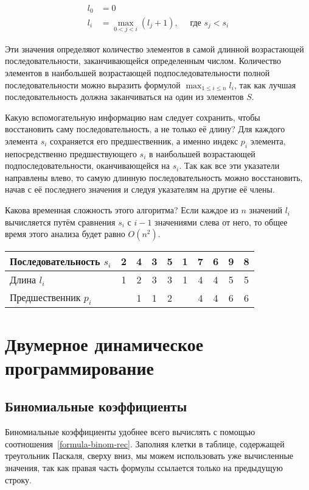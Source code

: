 \documentclass[14pt,openany]{book}
\begin{document}
\begin{align*}
l_0 &= 0 \\
l_i &= \max_{0<j<i}(l_j + 1), \quad \text{ где $s_j < s_i$}
\end{align*}

Эти значения определяют количество элементов в самой длинной возрастающей последовательности,
заканчивающейся определенным числом. Количество элементов в наибольшей возрастающей
подпоследовательности полной последовательности можно выразить формулой $\max_{1\le i\le n}l_i$,
так как лучшая последовательность должна заканчиваться на один из элементов $S$.

Какую вспомогательную информацию нам следует сохранить, чтобы восстановить саму
последовательность, а не только её длину? Для каждого элемента $s_i$ сохраняется его
предшественник, а именно индекс $p_i$ элемента, непосредственно предшествующего $s_i$
в наибольшей возрастающей подпоследовательности, оканчивающейся на $s_i$. Так как все
эти указатели направлены влево, то самую длинную последовательность можно восстановить,
начав с её последнего значения и следуя указателям на другие её члены.

Какова временная сложность этого алгоритма? Если каждое из $n$ значений $l_i$ вычисляется
путём сравнения $s_i$ с $i-1$ значениями слева от него, то общее время этого анализа
будет равно $O(n^2)$.

\begin{tabular}{l|c|c|c|c|c|c|c|c|c}
Последовательность $s_i$ & 2 & 4 & 3 & 5 & 1 & 7 & 6 & 9 & 8 \\
\hline
Длина $l_i$              & 1 & 2 & 3 & 3 & 1 & 4 & 4 & 5 & 5 \\
\hline
Предшественник $p_i$     &   & 1 & 1 & 2 &   & 4 & 4 & 6 & 6 \\
\end{tabular}



\chapter{Двумерное динамическое программирование}

\section{Биномиальные коэффициенты}

Биномиальные коэффициенты удобнее всего вычислять с помощью соотношения~\ref{formula-binom-rec}.
Заполняя клетки в таблице, содержащей треугольник Паскаля, сверху вниз, мы можем
использовать уже вычисленные значения, так как правая часть формулы ссылается только на
предыдущую строку.
\end{document}
